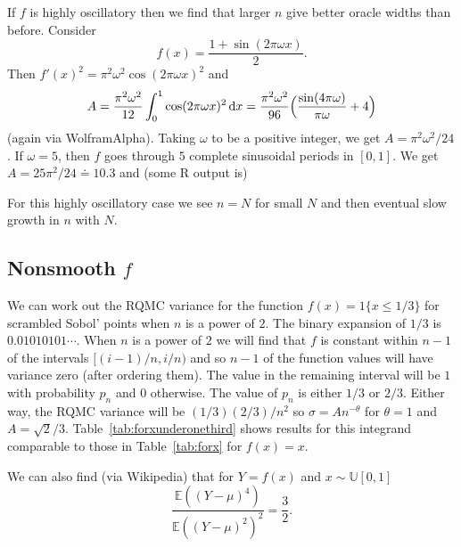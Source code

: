 \documentclass{article}
\renewcommand{\le}{\leqslant}
\newcommand{\e}{\mathbb{E}}
\newcommand{\runif}{\mathbb{U}}
\newcommand{\rd}{\,\mathrm{d}}
\begin{document}
If $f$ is highly oscillatory then we find that larger $n$
give better oracle widths than before.  Consider
$$
f(x) = \frac{1+\sin(2\pi\omega x)}2.
$$
Then $f'(x)^2=\pi^2\omega^2\cos(2\pi\omega x)^2$ and 
$$
A = \frac{\pi^2\omega^2}{12}\int_0^1\cos(2\pi\omega x)^2\rd x
= \frac{\pi^2\omega^2}{96}\Bigl( \frac{\sin(4\pi\omega)}{\pi\omega}+4\Bigr)
$$
(again via WolframAlpha). Taking $\omega$ to be a positive integer, we get
$A=\pi^2\omega^2/24$.
If $\omega =5$, then $f$ goes through $5$ complete sinusoidal periods
in $[0,1]$. We get $A=25\pi^2/24\doteq10.3$ and (some R output is)

For this highly oscillatory case we see $n=N$ for small $N$ and
then eventual slow growth in $n$ with $N$.

\subsection{Nonsmooth $f$}

We can work out the RQMC variance for the function $f(x)=1\{x\le 1/3\}$ for scrambled Sobol' points
when $n$ is a power of $2$. The binary expansion of $1/3$
is $0.01010101\cdots$.  When $n$ is a power of $2$ we will find that $f$ is constant within $n-1$ of the intervals $[(i-1)/n,i/n)$ and so $n-1$ of the function values will have variance zero (after ordering them). The value in the remaining interval will be $1$ with probability $p_n$ and $0$ otherwise.  The value of $p_n$ is either $1/3$ or $2/3$. Either way, the RQMC variance will be $(1/3)(2/3)/n^2$ so $\sigma=An^{-\theta}$ for $\theta=1$ and $A=\sqrt{2}/3$.  Table~\ref{tab:forxunderonethird} shows results for this integrand comparable
to those in Table~\ref{tab:forx} for $f(x)=x$.

We can also find (via Wikipedia) that for $Y=f(x)$
and $x\sim\runif[0,1]$
$$
\frac{\e((Y-\mu)^4)}{\e((Y-\mu)^2)^2} = \frac32.
$$
\end{document}
